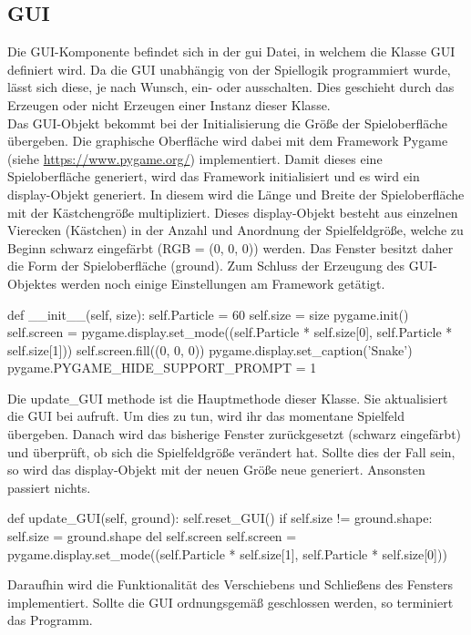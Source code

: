 \subsection{GUI} \label{sec:Implementierung_GUI}
Die GUI-Komponente befindet sich in der gui Datei, in welchem die Klasse GUI definiert wird. Da die GUI unabhängig von der Spiellogik programmiert wurde, lässt sich diese, je nach Wunsch, ein- oder ausschalten. Dies geschieht durch das Erzeugen oder nicht Erzeugen einer Instanz dieser Klasse.\\
Das GUI-Objekt bekommt bei der Initialisierung die Größe der Spieloberfläche übergeben. Die graphische Oberfläche wird dabei mit dem Framework Pygame (siehe \url{https://www.pygame.org/}) implementiert. Damit dieses eine Spieloberfläche generiert, wird das Framework initialisiert und es wird ein display-Objekt generiert. In diesem wird die Länge und Breite der Spieloberfläche mit der Kästchengröße multipliziert. Dieses display-Objekt besteht aus einzelnen Vierecken (Kästchen) in der Anzahl und Anordnung der Spielfeldgröße, welche zu Beginn schwarz eingefärbt (RGB = (0, 0, 0)) werden. Das Fenster besitzt daher die Form der Spieloberfläche (ground). Zum Schluss der Erzeugung des GUI-Objektes werden noch einige Einstellungen am Framework getätigt.
\begin{python}
	def __init__(self, size):
		self.Particle = 60
		self.size = size
		pygame.init()
		self.screen = pygame.display.set_mode((self.Particle * 
								  self.size[0], self.Particle * self.size[1]))
		self.screen.fill((0, 0, 0))
		pygame.display.set_caption('Snake')
		pygame.PYGAME_HIDE_SUPPORT_PROMPT = 1
\end{python}
Die update\_GUI methode ist die Hauptmethode dieser Klasse. Sie aktualisiert die GUI bei aufruft. Um dies zu tun, wird ihr das momentane Spielfeld übergeben. Danach wird das bisherige Fenster zurückgesetzt (schwarz eingefärbt) und überprüft, ob sich die Spielfeldgröße verändert hat. Sollte dies der Fall sein, so wird das display-Objekt mit der neuen Größe neue generiert. Ansonsten passiert nichts.
\begin{python}
	def update_GUI(self, ground):
		self.reset_GUI()
		if self.size != ground.shape:
			self.size = ground.shape
			del self.screen
			self.screen = pygame.display.set_mode((self.Particle * self.size[1], self.Particle * self.size[0]))
\end{python}
Daraufhin wird die Funktionalität des Verschiebens und Schließens des Fensters implementiert. Sollte die GUI ordnungsgemäß geschlossen werden, so terminiert das Programm.
